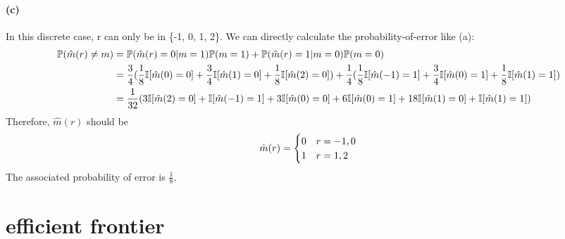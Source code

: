 \documentclass{article}
\begin{document}
\paragraph{(c)}
In this discrete case, r can only be in \{-1, 0, 1, 2\}. We can directly calculate the probability-of-error like (a):
\begin{align}
\mathbb{P}(\hat{m}(r)\neq m) &= \mathbb{P}(\hat{m}(r)=0| m=1)\mathbb{P}(m=1)+\mathbb{P}(\hat{m}(r)=1| m=0)\mathbb{P}(m=0) \notag\\
&= \frac{3}{4}(\frac{1}{8}\mathbb{I}[\hat{m}(0)=0]+\frac{3}{4}\mathbb{I}[\hat{m}(1)=0]+\frac{1}{8}\mathbb{I}[\hat{m}(2)=0])+\frac{1}{4}(\frac{1}{8}\mathbb{I}[\hat{m}(-1)=1]+\frac{3}{4}\mathbb{I}[\hat{m}(0)=1]+\frac{1}{8}\mathbb{I}[\hat{m}(1)=1])\notag\\
&= \frac{1}{32}(3\mathbb{I}[\hat{m}(2)=0]+\mathbb{I}[\hat{m}(-1)=1]+3\mathbb{I}[\hat{m}(0)=0]+6\mathbb{I}[\hat{m}(0)=1]+18\mathbb{I}[\hat{m}(1)=0]+\mathbb{I}[\hat{m}(1)=1])\notag
\end{align}
Therefore, $\hat{m}(r)$ should be
\begin{align}
	\hat{m}(r)=\begin{cases}
		0& r=-1,0\\
		1& r=1,2
	\end{cases}\notag
\end{align}
The associated probability of error is $\frac{1}{8}$.

\section{efficient frontier}
\end{document}
